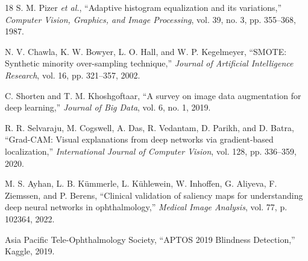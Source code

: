 \documentclass[11pt,a4paper]{article}
\begin{document}
\begin{thebibliography}{18}
S. M. Pizer \emph{et al.}, ``Adaptive histogram equalization and its variations,'' \emph{Computer Vision, Graphics, and Image Processing}, vol. 39, no. 3, pp. 355--368, 1987.

N. V. Chawla, K. W. Bowyer, L. O. Hall, and W. P. Kegelmeyer, ``SMOTE: Synthetic minority over-sampling technique,'' \emph{Journal of Artificial Intelligence Research}, vol. 16, pp. 321--357, 2002.

C. Shorten and T. M. Khoshgoftaar, ``A survey on image data augmentation for deep learning,'' \emph{Journal of Big Data}, vol. 6, no. 1, 2019.

R. R. Selvaraju, M. Cogswell, A. Das, R. Vedantam, D. Parikh, and D. Batra, ``Grad-CAM: Visual explanations from deep networks via gradient-based localization,'' \emph{International Journal of Computer Vision}, vol. 128, pp. 336--359, 2020.

M. S. Ayhan, L. B. Kümmerle, L. Kühlewein, W. Inhoffen, G. Aliyeva, F. Ziemssen, and P. Berens, ``Clinical validation of saliency maps for understanding deep neural networks in ophthalmology,'' \emph{Medical Image Analysis}, vol. 77, p. 102364, 2022.

Asia Pacific Tele-Ophthalmology Society, ``APTOS 2019 Blindness Detection,'' Kaggle, 2019.

\end{thebibliography}
\end{document}
